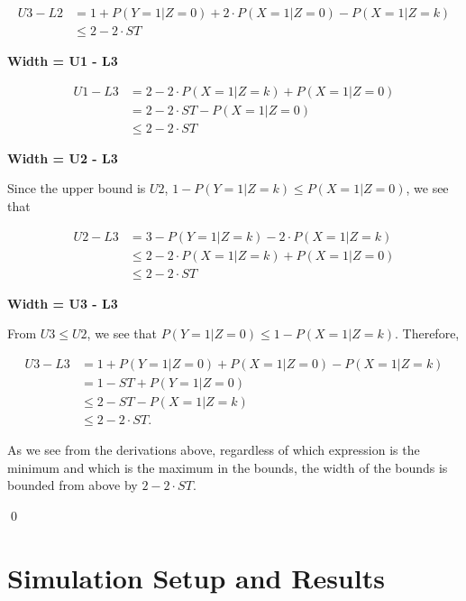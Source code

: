 \documentclass[AMA,STIX1COL,]{WileyNJD-v2}
\begin{document}
\[\begin{aligned}
U3 - L2 &= 1 + P(Y = 1 | Z = 0) + 2\cdot P(X = 1 | Z = 0) - P(X = 1 | Z = k) \\
        &\le 2 - 2\cdot ST
\end{aligned}\]

\textbf{Width = U1 - L3}

\[\begin{aligned}
U1 - L3 &= 2 - 2\cdot P(X = 1 | Z = k) + P(X = 1 | Z = 0) \\
        &= 2 - 2\cdot ST - P(X = 1 | Z = 0) \\
        &\le 2 - 2\cdot ST
\end{aligned}\]

\textbf{Width = U2 - L3}

Since the upper bound is \(U2\),
\(1 - P(Y = 1 | Z = k) \le P(X = 1 | Z = 0)\), we see that

\[\begin{aligned}
U2 - L3 &= 3 - P(Y = 1 | Z = k) - 2\cdot P(X = 1 | Z = k) \\
        &\le 2 - 2\cdot P(X = 1 | Z = k) + P(X = 1 | Z = 0) \\
        &\le 2 - 2\cdot ST
\end{aligned}\]

\textbf{Width = U3 - L3}

From \(U3 \le U2\), we see that
\(P(Y = 1 | Z = 0) \le 1 - P(X = 1 | Z = k)\). Therefore,

\[\begin{aligned}
U3 - L3 &= 1 + P(Y = 1 | Z = 0) + P(X = 1 | Z = 0) - P(X = 1 | Z = k)\\
        &= 1 - ST + P(Y = 1 | Z = 0) \\
        &\le 2 - ST - P(X = 1 | Z = k) \\
        &\le 2 - 2\cdot ST.
\end{aligned}\]

As we see from the derivations above, regardless of which expression is
the minimum and which is the maximum in the bounds, the width of the
bounds is bounded from above by \(2 - 2\cdot ST\).

\qed

\newpage

\hypertarget{simulation-setup-and-results}{%
\section{Simulation Setup and
Results}\label{simulation-setup-and-results}}
\end{document}
